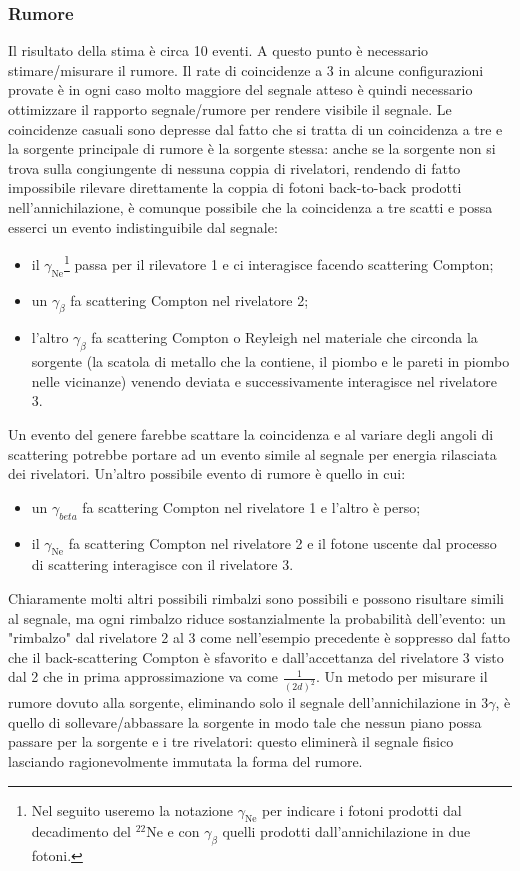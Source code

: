 \subsubsection{Rumore}
Il risultato della stima è circa 10 eventi. A questo punto è necessario stimare/misurare il rumore.
Il rate di coincidenze a 3 in alcune configurazioni provate è in ogni caso molto maggiore del segnale atteso è quindi necessario ottimizzare il rapporto segnale/rumore per rendere visibile il segnale.
Le coincidenze casuali sono depresse dal fatto che si tratta di un coincidenza a tre e la sorgente principale di rumore è la sorgente stessa: 
anche se la sorgente non si trova sulla congiungente di nessuna coppia di rivelatori, rendendo di fatto impossibile rilevare direttamente la coppia di fotoni back-to-back prodotti nell'annichilazione, è comunque possibile che la coincidenza a tre scatti e possa esserci un evento indistinguibile dal segnale:
\begin{itemize}
	\item il $\gamma_{\text{Ne}}$\footnote{Nel seguito useremo la notazione $\gamma_{\text{Ne}}$ per indicare i fotoni prodotti dal decadimento del $^22\text{Ne}$ e con $\gamma_{\beta}$ quelli prodotti dall'annichilazione in due fotoni.} passa per il rilevatore 1 e ci interagisce facendo scattering Compton;
	\item un $\gamma_{\beta}$ fa scattering Compton nel rivelatore 2;
	\item l'altro $\gamma_{\beta}$ fa scattering Compton o Reyleigh nel materiale che circonda la sorgente (la scatola di metallo che la contiene, il piombo e le pareti in piombo nelle vicinanze) venendo deviata e successivamente interagisce nel rivelatore 3.
\end{itemize}
Un evento del genere farebbe scattare la coincidenza e al variare degli angoli di scattering potrebbe portare ad un evento simile al segnale per energia rilasciata dei rivelatori. Un'altro possibile evento di rumore è quello in cui:
\begin{itemize}
	\item un $\gamma_{beta}$ fa scattering Compton nel rivelatore 1 e l'altro è perso;
	\item il $\gamma_{\text{Ne}}$ fa scattering Compton nel rivelatore 2 e il fotone uscente dal processo di scattering interagisce con il rivelatore 3.
\end{itemize}
Chiaramente molti altri possibili rimbalzi sono possibili e possono risultare simili al segnale, ma ogni rimbalzo riduce sostanzialmente la probabilità dell'evento: un "rimbalzo" dal rivelatore 2 al 3 come nell'esempio precedente è soppresso dal fatto che il back-scattering Compton è sfavorito e dall'accettanza del rivelatore 3 visto dal 2 che in prima approssimazione va come $\frac{1}{(2d)^2}$.
Un metodo per misurare il rumore dovuto alla sorgente, eliminando solo il segnale dell'annichilazione in $3\gamma$, è quello di sollevare/abbassare la sorgente in modo tale che nessun piano possa passare per la sorgente e i tre rivelatori: questo eliminerà il segnale fisico lasciando ragionevolmente immutata la forma del rumore.
